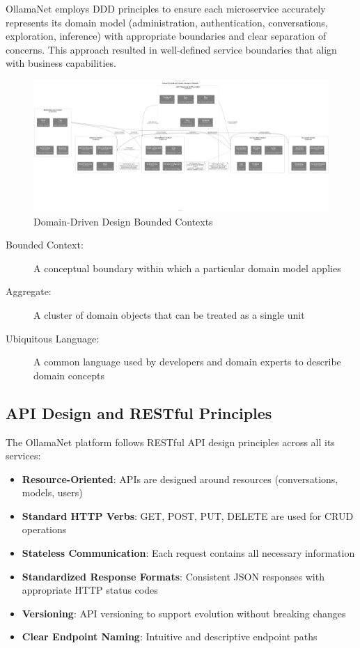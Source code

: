 OllamaNet employs DDD principles to ensure each microservice accurately represents its domain model (administration, authentication, conversations, exploration, inference) with appropriate boundaries and clear separation of concerns. This approach resulted in well-defined service boundaries that align with business capabilities.

\begin{figure}[p]
    \centering
    \includegraphics[width=\textwidth]{./Chapter02/figures/DDD_Bounded_Contexts.png}
    \caption{Domain-Driven Design Bounded Contexts}
    \label{fig:ddd-contexts}
\end{figure}
\clearpage

\begin{terminology}
\begin{description}
    \item[Bounded Context:] A conceptual boundary within which a particular domain model applies
    \item[Aggregate:] A cluster of domain objects that can be treated as a single unit
    \item[Ubiquitous Language:] A common language used by developers and domain experts to describe domain concepts
\end{description}
\end{terminology}

\subsection{API Design and RESTful Principles}

The OllamaNet platform follows RESTful API design principles across all its services:

\begin{itemize}
    \item \textbf{Resource-Oriented}: APIs are designed around resources (conversations, models, users)
    \item \textbf{Standard HTTP Verbs}: GET, POST, PUT, DELETE are used for CRUD operations
    \item \textbf{Stateless Communication}: Each request contains all necessary information
    \item \textbf{Standardized Response Formats}: Consistent JSON responses with appropriate HTTP status codes
    \item \textbf{Versioning}: API versioning to support evolution without breaking changes
    \item \textbf{Clear Endpoint Naming}: Intuitive and descriptive endpoint paths
\end{itemize}

